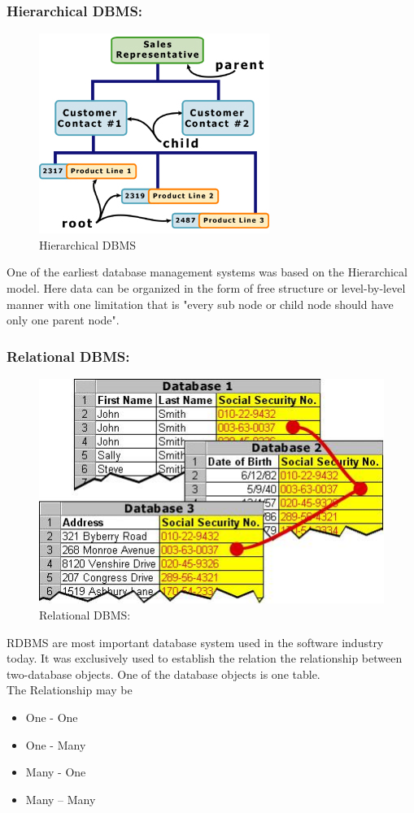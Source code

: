 \documentclass[12pt]{article} %
\begin{document}
\subsubsection{\textbf{Hierarchical DBMS:}}                                
 \begin{figure}[H]
 \centering
  \includegraphics[width=0.6\linewidth]{hierarchical.jpg}
  \caption{Hierarchical DBMS}
  \label{fig:figure 12}
\end{figure}
One of the earliest database management systems was based on the Hierarchical model. Here data can be organized in the form of free structure or level-by-level manner with one limitation that is "every sub node or child node should have only one parent node".
\subsubsection{\textbf{Relational DBMS:}}
 \begin{figure}[H]
 \centering
   \includegraphics[width=0.8\linewidth]{relational.jpg}
  \caption{Relational DBMS:}
  \label{fig:figure 13}
\end{figure}
RDBMS are most important database system used in the software industry today. It was exclusively used to establish the relation the relationship between two-database objects. One of the database objects is one table.
\\The Relationship may be
\begin{itemize}
\item One - One 
\item One - Many
\item Many - One
\item Many – Many
\end{itemize}
\end{document}
